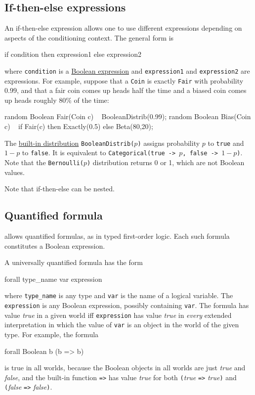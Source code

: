 \documentclass[12pt]{article}
\begin{document}
\subsection{If-then-else expressions}\label{if-then-else-section}

An if-then-else expression allows one to use different expressions depending on aspects of the conditioning context.
The general form is
\begin{blogcode}
if condition then expression1 else expression2
\end{blogcode}
where \texttt{condition} is a \hyperref[Boolean-expression-section]{Boolean expression} and \texttt{expression1} and \texttt{expression2}
are expressions. For example, suppose that a {\tt Coin} is exactly {\tt Fair} with probability 0.99, and that
a fair coin comes up heads half the time and a biased coin comes up heads roughly 80\% of the time:
\begin{blogcode}
random Boolean Fair(Coin c) ~ BooleanDistrib(0.99);
random Boolean Bias(Coin c) ~  
  if Fair(c) then Exactly(0.5) 
  else Beta(80,20);
\end{blogcode}
The \hyperref[builtin-distribution-appendix]{built-in distribution}
{\tt BooleanDistrib($p$)} assigns probability $p$ to {\tt true} and
$1-p$ to {\tt false}. It is equivalent to {\tt Categorical({true ->
    $p$, false -> $1-p$})}. Note that the {\tt Bernoulli($p$)}
distribution returns 0 or 1, which are not Boolean values. 

Note that if-then-else can be nested. 



\subsection{Quantified formula}\label{quantifier-section}
\bl allows quantified formulas, as in typed first-order logic. 
Each such formula constitutes a Boolean expression.

A universally quantified formula has the form
\begin{blogcode}
forall type_name var expression
\end{blogcode}
where {\tt type\_name} is any type and {\tt var} is the name of a
logical variable. The {\tt expression} is any Boolean expression,
possibly containing {\tt var}. The formula has value {\it true}
in a given world iff {\tt expression} has value {\it true}
in {\em every} extended interpretation in which the value of {\tt var} 
is an object in the world of the given type. For example, the formula
\begin{blogcode}
forall Boolean b (b => b)
\end{blogcode}
is true in all worlds, because the Boolean objects in all worlds are 
just {\it true} and {\it false}, and the built-in function {\tt =>}
has value {\it true} for both {\tt (}{\it true} {\tt =>} {\it true}{\tt )}
and {\tt (}{\it false} {\tt =>} {\it false}{\tt )}.
\end{document}
